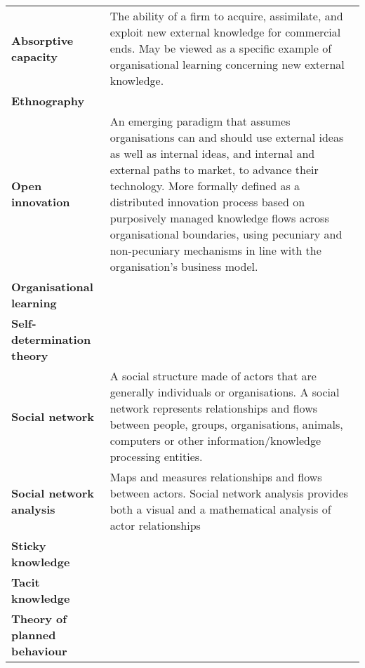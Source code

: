 

\begin{longtable}{l p{10cm}}
	\textbf{Absorptive capacity} & The ability of a firm to acquire, assimilate, and exploit new external knowledge for commercial ends. May be viewed as a specific example of organisational learning concerning new external knowledge.\\ 
	\textbf{Ethnography} & \\
	\textbf{Open innovation} & An emerging paradigm that assumes organisations can and should use external ideas as well as internal ideas, and internal and external paths to market, to advance their technology. More formally defined as a distributed innovation process based on purposively managed knowledge flows across organisational boundaries, using pecuniary and non-pecuniary mechanisms in line with the organisation’s business model. \\ 
	\textbf{Organisational learning} & \\
	\textbf{Self-determination theory} & \\
	\textbf{Social network} & A social structure made of actors that are generally individuals or organisations. A social network represents relationships and flows between people, groups, organisations, animals, computers or other information/knowledge processing entities.\\
	\textbf{Social network analysis} &  Maps and measures relationships and flows between actors. Social network analysis provides both a visual and a mathematical analysis of actor relationships \\
	\textbf{Sticky knowledge} & \\
	\textbf{Tacit knowledge} & \\
	\textbf{Theory of planned behaviour} & \\
	
\end{longtable} 